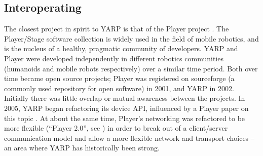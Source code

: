 








\subsection{Interoperating}

The closest project in spirit to YARP is that of the Player project
\cite{vaughan2006reusable}.  
%
%
The Player/Stage software collection is 
widely used in the field of mobile robotics, and is the nucleus of
a healthy, pragmatic community of developers.  
%
YARP and Player were developed
independently in different robotics communities (humanoids and mobile
robots respectively) over a similar time period.  Both over time
became open source projects; Player was registered on sourceforge (a
commonly used repository for open software) in 2001, and YARP in 2002.
Initially there was little overlap or mutual awareness between the
projects.  In 2005, YARP began refactoring its device API, influenced 
by a Player paper on this topic \cite{vaughan2003device}.
At about the same time, Player's networking was refactored to be
more flexible (``Player 2.0'', see \cite{collett2005player}) in 
order to break out of a client/server communication model and
allow a more flexible network and transport choices -- an area where 
YARP has historically been strong.  

